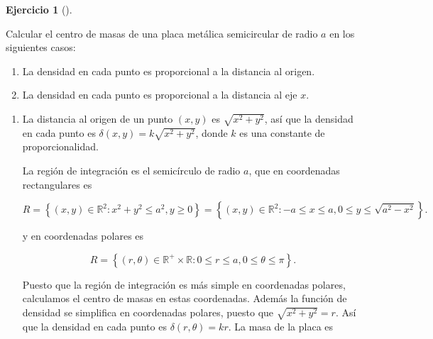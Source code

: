 \documentclass[
  spanish,
  a4paper,
]{scrreport}
\providecommand{\tightlist}{%
  \setlength{\itemsep}{0pt}\setlength{\parskip}{0pt}}
\theoremstyle{definition}
\newtheorem{exercise}{Ejercicio}[chapter]
\theoremstyle{remark}
\begin{document}
\begin{exercise}[]\protect\hypertarget{exr-5}{}\label{exr-5}

Calcular el centro de masas de una placa metálica semicircular de radio
\(a\) en los siguientes casos:

\begin{enumerate}
\def\labelenumi{\alph{enumi}.}
\tightlist
\item
  La densidad en cada punto es proporcional a la distancia al origen.
\item
  La densidad en cada punto es proporcional a la distancia al eje \(x\).
\end{enumerate}

\end{exercise}

\begin{tcolorbox}[enhanced jigsaw, arc=.35mm, bottomrule=.15mm, bottomtitle=1mm, breakable, colback=white, colbacktitle=quarto-callout-tip-color!10!white, colframe=quarto-callout-tip-color-frame, coltitle=black, left=2mm, leftrule=.75mm, opacityback=0, opacitybacktitle=0.6, rightrule=.15mm, title=\textcolor{quarto-callout-tip-color}{\faLightbulb}\hspace{0.5em}{Solución}, titlerule=0mm, toprule=.15mm, toptitle=1mm]

\begin{enumerate}
\def\labelenumi{\alph{enumi}.}
\item
  La distancia al origen de un punto \((x,y)\) es \(\sqrt{x^2+y^2}\),
  así que la densidad en cada punto es \(\delta(x,y)=k\sqrt{x^2+y^2}\),
  donde \(k\) es una constante de proporcionalidad.

  La región de integración es el semicírculo de radio \(a\), que en
  coordenadas rectangulares es

  \[
  R = \left\{ (x,y) \in \mathbb{R}^2: x^2+y^2 \leq a^2, y \geq 0 \right\} 
  = \left\{ (x,y) \in \mathbb{R}^2: -a \leq x \leq a, 0 \leq y \leq \sqrt{a^2-x^2} \right\}.
  \]

  y en coordenadas polares es

  \[
  R = \left\{ (r,\theta) \in \mathbb{R}^+\times \mathbb{R}: 0 \leq r \leq a, 0 \leq \theta \leq \pi \right\}.
  \]

  Puesto que la región de integración es más simple en coordenadas
  polares, calculamos el centro de masas en estas coordenadas. Además la
  función de densidad se simplifica en coordenadas polares, puesto que
  \(\sqrt{x^2+y^2} = r\). Así que la densidad en cada punto es
  \(\delta(r,\theta)=kr\). La masa de la placa es


\end{enumerate}
\end{tcolorbox}
\end{document}
